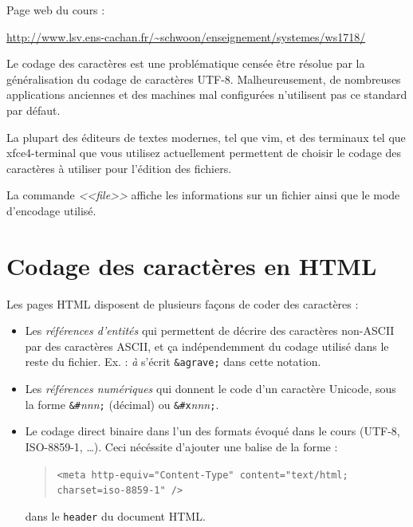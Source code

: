 \documentclass[11pt]{article}
\newcommand{\numtd}{05}
\newcommand{\titretd}{Codages de caractères}
\begin{document}
\entete{\numtd}{\titretd}

\begin{introduction}
 Page web du cours :
 \begin{center}
  \url{http://www.lsv.ens-cachan.fr/~schwoon/enseignement/systemes/ws1718/}
 \end{center}

Le codage des caractères est une problématique censée être résolue par la
généralisation du codage de caractères UTF-8. Malheureusement, de nombreuses
applications anciennes et des machines mal configurées n'utilisent pas ce
standard par défaut.

La plupart des éditeurs de textes modernes, tel que vim, et des terminaux tel
que xfce4-terminal que vous utilisez actuellement permettent de choisir le
codage des caractères à utiliser pour l'édition des fichiers. 

La commande \textit{<<file>>} affiche les informations sur un fichier ainsi que
le mode d'encodage utilisé.

\end{introduction}


\section{Codage des caractères en HTML}

Les pages HTML disposent de plusieurs façons de coder des caractères :\\

\begin{itemize}
 \item Les \emph{références d'entités} qui permettent de décrire
des caractères non-ASCII par des caractères ASCII, et ça indépendemment du
codage utilisé dans le reste du fichier. Ex. : \emph{à} s'écrit
\texttt{\&agrave;} dans cette notation.\smallskip
 \item Les \emph{références
numériques} qui donnent le code d'un caractère Unicode, sous la forme
\texttt{\&\#}\emph{nnn}\texttt{;} (décimal) ou
\texttt{\&\#x}\emph{nnn}\texttt{;}.\smallskip
 \item Le codage direct binaire
dans l'un des formats évoqué dans le cours (UTF-8, ISO-8859-1, \ldots). Ceci
nécéssite d'ajouter une balise de la forme :
 \begin{quote}
  \texttt{<meta http-equiv="Content-Type" content="text/html; charset=iso-8859-1" />}
 \end{quote}
dans le \texttt{header} du document HTML.\\
\end{itemize}
\end{document}
